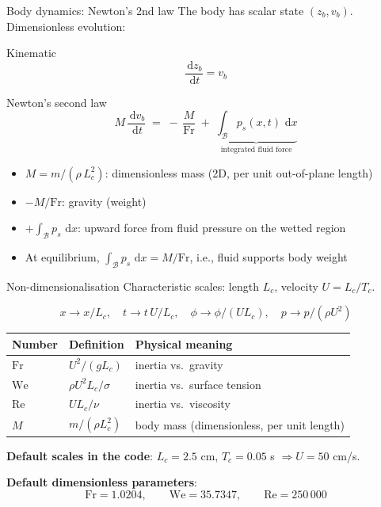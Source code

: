 \documentclass[aspectratio=169, 10pt]{beamer}
\newcommand{\Fr}{\mathrm{Fr}}
\newcommand{\We}{\mathrm{We}}
\newcommand{\Rey}{\mathrm{Re}}
\newcommand{\dd}{\,\mathrm{d}}
\begin{document}
\begin{frame}{Body dynamics: Newton's 2nd law}
The body has scalar state $(z_b, v_b)$. Dimensionless evolution:

\begin{block}{Kinematic}
\[
\frac{\dd z_b}{\dd t} = v_b
\]
\end{block}

\begin{block}{Newton's second law}
\[
M\,\frac{\dd v_b}{\dd t} \;=\; -\,\frac{M}{\Fr} \;+\; \underbrace{\int_{\mathcal{B}} p_s(x,t)\,\dd x}_{\text{integrated fluid force}}
\]
\end{block}

\begin{itemize}
    \item $M = m / (\rho\, L_c^2)$: dimensionless mass (2D, per unit out-of-plane length)
    \item $-M/\Fr$: gravity (weight)
    \item $+\int_\mathcal{B} p_s\,\dd x$: upward force from fluid pressure on the wetted region
    \item At equilibrium, $\int_\mathcal{B} p_s\,\dd x = M/\Fr$, i.e., fluid supports body weight
\end{itemize}
\end{frame}

\begin{frame}{Non-dimensionalisation}
Characteristic scales: length $L_c$, velocity $U = L_c/T_c$.

\[
x \to x/L_c,\quad t \to t\,U/L_c,\quad \phi \to \phi/(U L_c),\quad p \to p/(\rho U^2)
\]

\begin{center}
\renewcommand{\arraystretch}{1.3}
\begin{tabular}{@{}lll@{}}
\toprule
Number & Definition & Physical meaning \\
\midrule
$\Fr$  & $U^2/(g L_c)$      & inertia vs.\ gravity \\
$\We$  & $\rho U^2 L_c/\sigma$ & inertia vs.\ surface tension \\
$\Rey$ & $U L_c / \nu$      & inertia vs.\ viscosity \\
$M$    & $m/(\rho L_c^2)$    & body mass (dimensionless, per unit length) \\
\bottomrule
\end{tabular}
\end{center}

\vspace{0.5em}
\textbf{Default scales in the code}: $L_c = 2.5$ cm, $T_c = 0.05$ s $\Rightarrow U = 50$ cm/s.

\vspace{0.3em}
\textbf{Default dimensionless parameters}:
\[
\Fr = 1.0204, \qquad \We = 35.7347, \qquad \Rey = 250\,000
\]
\end{frame}
\end{document}
